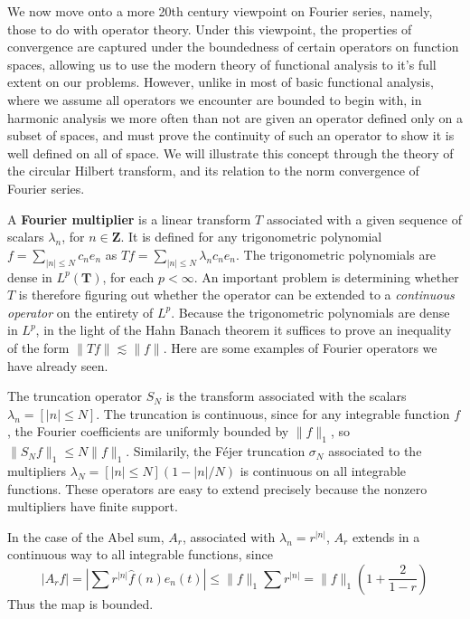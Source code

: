 We now move onto a more 20th century viewpoint on Fourier series, namely, those to do with operator theory. Under this viewpoint, the properties of convergence are captured under the boundedness of certain operators on function spaces, allowing us to use the modern theory of functional analysis to it's full extent on our problems. However, unlike in most of basic functional analysis, where we assume all operators we encounter are bounded to begin with, in harmonic analysis we more often than not are given an operator defined only on a subset of spaces, and must prove the continuity of such an operator to show it is well defined on all of space. We will illustrate this concept through the theory of the circular Hilbert transform, and its relation to the norm convergence of Fourier series.

A {\bf Fourier multiplier} is a linear transform $T$ associated with a given sequence of scalars $\lambda_n$, for $n \in \mathbf{Z}$. It is defined for any trigonometric polynomial $f = \sum_{|n| \leq N} c_n e_n$ as $Tf = \sum_{|n| \leq N} \lambda_n c_n e_n$. The trigonometric polynomials are dense in $L^p(\mathbf{T})$, for each $p < \infty$. An important problem is determining whether $T$ is therefore figuring out whether the operator can be extended to a {\it continuous operator} on the entirety of $L^p$. Because the trigonometric polynomials are dense in $L^p$, in the light of the Hahn Banach theorem it suffices to prove an inequality of the form $\| Tf \| \lesssim \| f \|$. Here are some examples of Fourier operators we have already seen.

\begin{example}
	The truncation operator $S_N$ is the transform associated with the scalars $\lambda_n = [|n| \leq N]$. The truncation is continuous, since for any integrable function $f$, the Fourier coefficients are uniformly bounded by $\| f \|_1$, so $\| S_N f \|_1 \leq N \| f \|_1$. Similarily, the F\'{e}jer truncation $\sigma_N$ associated to the multipliers $\lambda_N = [|n| \leq N](1 - |n|/N)$ is continuous on all integrable functions. These operators are easy to extend precisely because the nonzero multipliers have finite support.
\end{example}

\begin{example}
	In the case of the Abel sum, $A_r$, associated with $\lambda_n = r^{|n|}$, $A_r$ extends in a continuous way to all integrable functions, since
	\[ |A_r f| = \left| \sum r^{|n|} \widehat{f}(n) e_n(t) \right| \leq \| f \|_1 \sum r^{|n|} = \| f \|_1 \left( 1 + \frac{2}{1 - r} \right) \]
	Thus the map is bounded.
\end{example}


